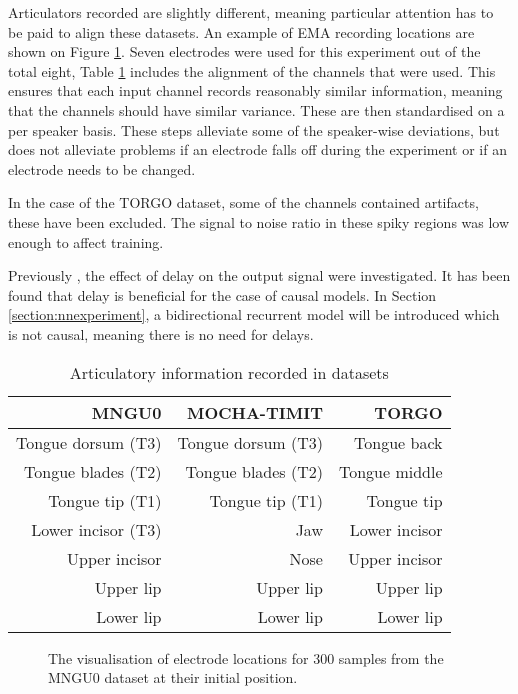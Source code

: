 \documentclass[a4paper]{article}
\begin{document}
Articulators recorded are slightly different, meaning particular attention has to be paid to align these datasets. An example of EMA recording locations are shown on Figure \ref{fig:electrodes}. Seven electrodes were used for this experiment out of the total eight, Table \ref{tab:electrodes} includes
the alignment of the channels that were used. This ensures that each
input channel records reasonably similar information, meaning that the
channels should have similar variance. These are then standardised on a per speaker
basis. These steps alleviate some
of the speaker-wise deviations, but does not alleviate problems if an electrode
falls off during the experiment or if an electrode needs to be changed.

In the case of the TORGO dataset, some of the channels contained artifacts,
these have been excluded. The signal to noise
ratio in these spiky regions was low enough to affect
training.

Previously \cite{Gonzalez2016}, the effect of delay on the
output signal were investigated. It has been found that delay
is beneficial for the case of causal models. In Section \ref{section:nnexperiment},
a bidirectional recurrent model will be introduced which is not causal, meaning there is no need for delays.

\begin{table}[th]
  \caption{Articulatory information recorded in datasets}
  \label{tab:electrodes}
  \centering
  \begin{tabular}{ r r r  }
    \toprule
    \textbf{MNGU0} & \textbf{MOCHA-TIMIT} & \textbf{TORGO} \\ 
    \midrule
    Tongue dorsum (T3) & Tongue dorsum (T3) & Tongue back \\
    Tongue blades (T2) & Tongue blades (T2) & Tongue middle \\
    Tongue tip (T1) & Tongue tip (T1) & Tongue tip \\
    Lower incisor (T3) & Jaw & Lower incisor\\
    Upper incisor & Nose & Upper incisor\\
    Upper lip & Upper lip & Upper lip \\
    Lower lip & Lower lip  & Lower lip\\
    \bottomrule
    \end{tabular}
\end{table}


\begin{figure}[t]
  \caption{The visualisation of electrode locations for 300 samples from
    the MNGU0 dataset at their initial position.}
  \label{fig:electrodes}
  \begin{center}
    \scalebox{0.50}{}
\end{center}
\end{figure}
\end{document}
